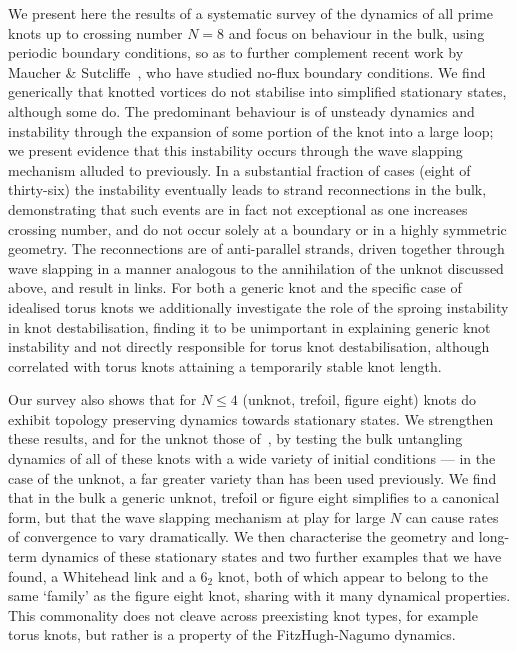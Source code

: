 We present here the results of a systematic survey of the dynamics of all prime knots up to crossing number $N=8$ and focus on behaviour in the bulk, using periodic boundary conditions, so as to further complement recent work by Maucher \& Sutcliffe~\citep{Maucher2016,Maucher2017,Maucher2018,Maucher2019}, who have studied no-flux boundary conditions. We find generically that knotted vortices do not stabilise into simplified stationary states, although some do. The predominant behaviour is of unsteady dynamics and instability through the expansion of some portion of the knot into a large loop; we present evidence that this instability occurs through the wave slapping mechanism alluded to previously. In a substantial fraction of cases (eight of thirty-six) the instability eventually leads to strand reconnections in the bulk, demonstrating that such events are in fact not exceptional as one increases crossing number, and do not occur solely at a boundary or in a highly symmetric geometry. The reconnections are of anti-parallel strands, driven together through wave slapping in a manner analogous to the annihilation of the unknot discussed above, and result in links. For both a generic knot and the specific case of idealised torus knots we additionally investigate the role of the sproing instability in knot destabilisation, finding it to be unimportant in explaining generic knot instability and not directly responsible for torus knot destabilisation, although correlated with torus knots attaining a temporarily stable knot length.

Our survey also shows that for $N\leq4$ (unknot, trefoil, figure eight) knots do exhibit topology preserving dynamics towards stationary states. We strengthen these results, and for the unknot those of~\citep{Maucher2016}, by testing the bulk untangling dynamics of all of these knots with a wide variety of initial conditions --- in the case of the unknot, a far greater variety than has been used previously. We find that in the bulk a generic unknot, trefoil or figure eight simplifies to a canonical form, but that the wave slapping mechanism at play for large $N$ can cause rates of convergence to vary dramatically. We then characterise the geometry and long-term dynamics of these stationary states and two further examples that we have found, a Whitehead link and a $6_2$ knot, both of which appear to belong to the same `family' as the figure eight knot, sharing with it many dynamical properties. This commonality does not cleave across preexisting knot types, for example torus knots, but rather is a property of the FitzHugh-Nagumo dynamics.


